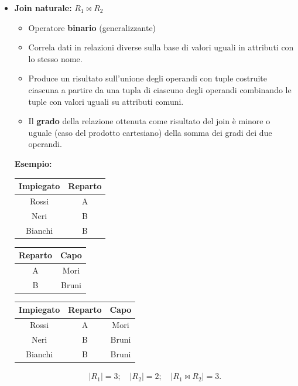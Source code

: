 \documentclass{article}
\newcommand{\sitemize}[1]{%
  \begin{itemize}[label=$\diamond$]
    #1
  \end{itemize}
}
\begin{document}
\begin{itemize}
    \item \textbf{Join naturale:} $R_1\bowtie R_2$\sitemize{
    \item Operatore \textbf{binario} (generalizzante)
    \item Correla dati in relazioni diverse sulla base di valori uguali in attributi con lo stesso nome.
    \item Produce un risultato sull'unione degli operandi con tuple costruite ciascuna a partire da una tupla di ciascuno degli operandi combinando le tuple con valori uguali su attributi comuni.
    \item Il \textbf{grado} della relazione ottenuta come risultato del join è minore o uguale (caso del prodotto cartesiano) della somma dei gradi dei due operandi. 
    }

\textbf{Esempio:}

\begin{minipage}{.3\textwidth}
  \centering
    \begin{tabular}{|c|c|}
        \hline
        \textbf{Impiegato} & \textbf{Reparto} \\
        \hline
        Rossi & A \\
        \hline
        Neri &  B \\
        \hline
        Bianchi & B \\
         \hline
        \end{tabular}
\end{minipage}%
\hfill
\begin{minipage}{.3\textwidth}
  \centering
       \begin{tabular}{|c|c|}
        \hline
        \textbf{Reparto} & \textbf{Capo} \\
        \hline
        A & Mori\\
        \hline
        B & Bruni\\
         \hline
        \end{tabular}
\hspace{1em}
\end{minipage}
\begin{minipage}{.3\textwidth}
  \centering
       \begin{tabular}{|c|c|c|}
        \hline
        \textbf{Impiegato} & \textbf{Reparto} & \textbf{Capo} \\
        \hline
        Rossi & A & Mori\\
        \hline
        Neri & B & Bruni\\
         \hline
         Bianchi & B & Bruni\\
         \hline
        \end{tabular}
\hspace{1em}
\end{minipage}
\begin{align*}
    |R_1| = 3; \quad |R_2| = 2; \quad |R_1 \bowtie R_2| = 3.
\end{align*}


\end{itemize}
\end{document}
